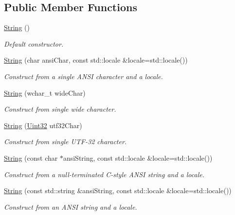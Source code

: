 \subsection*{Public Member Functions}
\begin{DoxyCompactItemize}
\item 
\hyperlink{classburn_1_1_string_a6c2a9c183185a6517d3939ac4ae356bb}{String} ()
\begin{DoxyCompactList}\small\item\em Default constructor. \end{DoxyCompactList}\item 
\hyperlink{classburn_1_1_string_af51a79a81210029650e8ba192b4aa997}{String} (char ansi\-Char, const std\-::locale \&locale=std\-::locale())
\begin{DoxyCompactList}\small\item\em Construct from a single A\-N\-S\-I character and a locale. \end{DoxyCompactList}\item 
\hyperlink{classburn_1_1_string_a008cbc555418be30aaf5a69c0a5c6fb9}{String} (wchar\-\_\-t wide\-Char)
\begin{DoxyCompactList}\small\item\em Construct from single wide character. \end{DoxyCompactList}\item 
\hyperlink{classburn_1_1_string_a7bcbce96cf6e89552855dae02561db27}{String} (\hyperlink{namespaceburn_ab40b09022209bd449d317c1f0e95356b}{Uint32} utf32\-Char)
\begin{DoxyCompactList}\small\item\em Construct from single U\-T\-F-\/32 character. \end{DoxyCompactList}\item 
\hyperlink{classburn_1_1_string_aca30936fde5294c14d5ce855823e03e0}{String} (const char $\ast$ansi\-String, const std\-::locale \&locale=std\-::locale())
\begin{DoxyCompactList}\small\item\em Construct from a null-\/terminated C-\/style A\-N\-S\-I string and a locale. \end{DoxyCompactList}\item 
\hyperlink{classburn_1_1_string_a5e45efc34aa57def453fbd6f995dbac4}{String} (const std\-::string \&ansi\-String, const std\-::locale \&locale=std\-::locale())
\begin{DoxyCompactList}\small\item\em Construct from an A\-N\-S\-I string and a locale. \end{DoxyCompactList}\item 

\end{DoxyCompactItemize}
